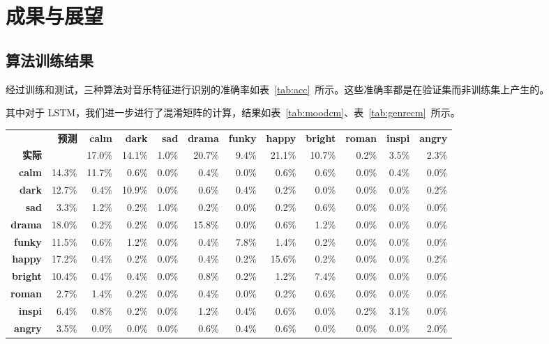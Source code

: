 \documentclass[a4paper,utf8,10pt]{article}
\begin{document}
\section{成果与展望}
\subsection{算法训练结果}

经过训练和测试，三种算法对音乐特征进行识别的准确率如表~\ref{tab:acc}~所示。这些准确率都是在验证集而非训练集上产生的。

其中对于 LSTM，我们进一步进行了混淆矩阵的计算，结果如表~\ref{tab:moodcm}、表~\ref{tab:genrecm}~所示。

\begin{center}

 \label{tab:moodcm}
\begin{tabular}{ | r r | r | r | r | r | r | r | r | r | r | r | }
\hline
 & \bf 预测 & \bf calm & \bf dark & \bf sad & \bf drama & \bf funky & \bf happy & \bf bright & \bf roman & \bf inspi & \bf angry \\
\bf 实际 & & 17.0\% & 14.1\% & 1.0\% & 20.7\% & 9.4\% & 21.1\% & 10.7\% & 0.2\% & 3.5\% & 2.3\% \\\hline
\bf calm & 14.3\% & 11.7\% & 0.6\% & 0.0\% & 0.4\% & 0.0\% & 0.6\% & 0.6\% & 0.0\% & 0.4\% & 0.0\% \\\hline
\bf dark & 12.7\% & 0.4\% & 10.9\% & 0.0\% & 0.6\% & 0.4\% & 0.2\% & 0.0\% & 0.0\% & 0.0\% & 0.2\% \\\hline
\bf sad & 3.3\% & 1.2\% & 0.2\% & 1.0\% & 0.2\% & 0.0\% & 0.2\% & 0.6\% & 0.0\% & 0.0\% & 0.0\% \\\hline
\bf drama & 18.0\% & 0.2\% & 0.2\% & 0.0\% & 15.8\% & 0.0\% & 0.6\% & 1.2\% & 0.0\% & 0.0\% & 0.0\% \\\hline
\bf funky & 11.5\% & 0.6\% & 1.2\% & 0.0\% & 0.4\% & 7.8\% & 1.4\% & 0.2\% & 0.0\% & 0.0\% & 0.0\% \\\hline
\bf happy & 17.2\% & 0.4\% & 0.2\% & 0.0\% & 0.4\% & 0.2\% & 15.6\% & 0.2\% & 0.0\% & 0.0\% & 0.2\% \\\hline
\bf bright & 10.4\% & 0.4\% & 0.4\% & 0.0\% & 0.8\% & 0.2\% & 1.2\% & 7.4\% & 0.0\% & 0.0\% & 0.0\% \\\hline
\bf roman & 2.7\% & 1.4\% & 0.2\% & 0.0\% & 0.4\% & 0.0\% & 0.2\% & 0.6\% & 0.0\% & 0.0\% & 0.0\% \\\hline
\bf inspi & 6.4\% & 0.8\% & 0.2\% & 0.0\% & 1.2\% & 0.4\% & 0.6\% & 0.0\% & 0.2\% & 3.1\% & 0.0\% \\\hline
\bf angry & 3.5\% & 0.0\% & 0.0\% & 0.0\% & 0.6\% & 0.4\% & 0.6\% & 0.0\% & 0.0\% & 0.0\% & 2.0\% \\\hline
\end{tabular}


\end{center}
\end{document}
